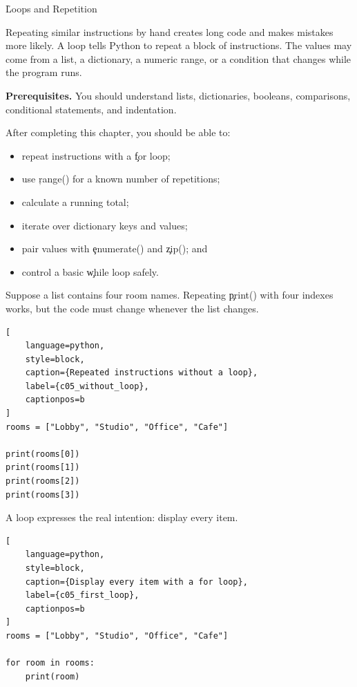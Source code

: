 
\h{Loops and Repetition}
\label{ch:05}

Repeating similar instructions by hand creates long code and makes mistakes
more likely. A loop tells Python to repeat a block of instructions. The values
may come from a list, a dictionary, a numeric range, or a condition that
changes while the program runs.

\begin{NoteBox}
\textbf{Prerequisites.} You should understand lists, dictionaries, booleans,
comparisons, conditional statements, and indentation.
\end{NoteBox}

\begin{tcolorbox}[title=Learning outcomes,colframe=orange,colback=white,arc=2mm]
After completing this chapter, you should be able to:
\begin{itemize}
    \item repeat instructions with a \c{for} loop;
    \item use \c{range()} for a known number of repetitions;
    \item calculate a running total;
    \item iterate over dictionary keys and values;
    \item pair values with \c{enumerate()} and \c{zip()}; and
    \item control a basic \c{while} loop safely.
\end{itemize}
\end{tcolorbox}


Suppose a list contains four room names. Repeating \c{print()} with four
indexes works, but the code must change whenever the list changes.

\begin{lstlisting}[
    language=python,
    style=block,
    caption={Repeated instructions without a loop},
    label={c05_without_loop},
    captionpos=b
]
rooms = ["Lobby", "Studio", "Office", "Cafe"]

print(rooms[0])
print(rooms[1])
print(rooms[2])
print(rooms[3])
\end{lstlisting}

A loop expresses the real intention: display every item.

\begin{lstlisting}[
    language=python,
    style=block,
    caption={Display every item with a for loop},
    label={c05_first_loop},
    captionpos=b
]
rooms = ["Lobby", "Studio", "Office", "Cafe"]

for room in rooms:
    print(room)
\end{lstlisting}


